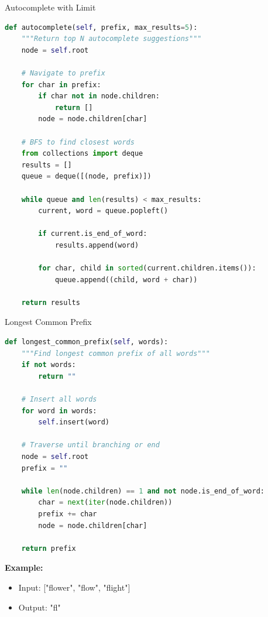\documentclass[aspectratio=169]{beamer}
\begin{document}
\begin{frame}[fragile]{Autocomplete with Limit}
  \begin{lstlisting}[language=Python, basicstyle=\ttfamily\footnotesize]
def autocomplete(self, prefix, max_results=5):
    """Return top N autocomplete suggestions"""
    node = self.root

    # Navigate to prefix
    for char in prefix:
        if char not in node.children:
            return []
        node = node.children[char]

    # BFS to find closest words
    from collections import deque
    results = []
    queue = deque([(node, prefix)])

    while queue and len(results) < max_results:
        current, word = queue.popleft()

        if current.is_end_of_word:
            results.append(word)

        for char, child in sorted(current.children.items()):
            queue.append((child, word + char))

    return results
  \end{lstlisting}
\end{frame}

\begin{frame}[fragile]{Longest Common Prefix}
  \begin{lstlisting}[language=Python, basicstyle=\ttfamily\small]
def longest_common_prefix(self, words):
    """Find longest common prefix of all words"""
    if not words:
        return ""

    # Insert all words
    for word in words:
        self.insert(word)

    # Traverse until branching or end
    node = self.root
    prefix = ""

    while len(node.children) == 1 and not node.is_end_of_word:
        char = next(iter(node.children))
        prefix += char
        node = node.children[char]

    return prefix
  \end{lstlisting}

  \vspace{0.3cm}
  \textbf{Example:}
  \begin{itemize}
    \item Input: ["flower", "flow", "flight"]
    \item Output: "fl"
  \end{itemize}
\end{frame}
\end{document}
